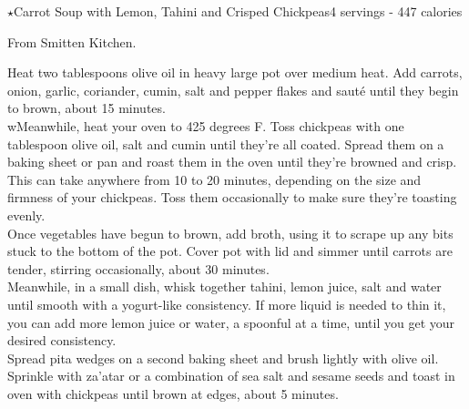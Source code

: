 \begin{recipe}{\texorpdfstring{$\star$}{str}Carrot Soup with Lemon, Tahini and Crisped Chickpeas}{4 servings - 447 calories}{}

\freeform From Smitten Kitchen.\\


Heat two tablespoons olive oil in heavy large pot over medium heat. Add carrots, onion, garlic, coriander, cumin, salt and pepper flakes and sauté until they begin to brown, about 15 minutes.\\

wMeanwhile, heat your oven to 425 degrees F. Toss chickpeas with one tablespoon olive oil, salt and cumin until they’re all coated. Spread them on a baking sheet or pan and roast them in the oven until they’re browned and crisp. This can take anywhere from 10 to 20 minutes, depending on the size and firmness of your chickpeas. Toss them occasionally to make sure they’re toasting evenly.\\

Once vegetables have begun to brown, add broth, using it to scrape up any bits stuck to the bottom of the pot. Cover pot with lid and simmer until carrots are tender, stirring occasionally, about 30 minutes.\\

Meanwhile, in a small dish, whisk together tahini, lemon juice, salt and water until smooth with a yogurt-like consistency. If more liquid is needed to thin it, you can add more lemon juice or water, a spoonful at a time, until you get your desired consistency.\\

Spread pita wedges on a second baking sheet and brush lightly with olive oil. Sprinkle with za’atar or a combination of sea salt and sesame seeds and toast in oven with chickpeas until brown at edges, about 5 minutes.


\end{recipe}
